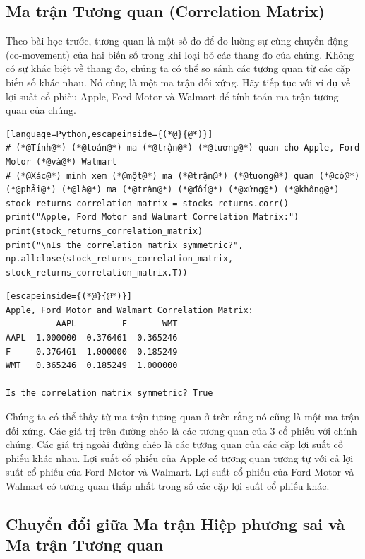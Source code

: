 \subsection{Ma trận Tương quan (Correlation Matrix)}

Theo bài học trước, tương quan là một số đo để đo lường sự cùng chuyển động (co-movement) của hai biến số trong khi loại bỏ các thang đo của chúng. Không có sự khác biệt về thang đo, chúng ta có thể so sánh các tương quan từ các cặp biến số khác nhau. Nó cũng là một ma trận đối xứng. Hãy tiếp tục với ví dụ về lợi suất cổ phiếu Apple, Ford Motor và Walmart để tính toán ma trận tương quan của chúng.

\begin{lstlisting}[language=Python,escapeinside={(*@}{@*)}]
# (*@Tính@*) (*@toán@*) ma (*@trận@*) (*@tương@*) quan cho Apple, Ford Motor (*@và@*) Walmart
# (*@Xác@*) minh xem (*@một@*) ma (*@trận@*) (*@tương@*) quan (*@có@*) (*@phải@*) (*@là@*) ma (*@trận@*) (*@đối@*) (*@xứng@*) (*@không@*)
stock_returns_correlation_matrix = stocks_returns.corr()
print("Apple, Ford Motor and Walmart Correlation Matrix:")
print(stock_returns_correlation_matrix)
print("\nIs the correlation matrix symmetric?", np.allclose(stock_returns_correlation_matrix, stock_returns_correlation_matrix.T))
\end{lstlisting}

\begin{lstlisting}[escapeinside={(*@}{@*)}]
Apple, Ford Motor and Walmart Correlation Matrix:
          AAPL         F       WMT
AAPL  1.000000  0.376461  0.365246
F     0.376461  1.000000  0.185249
WMT   0.365246  0.185249  1.000000

Is the correlation matrix symmetric? True
\end{lstlisting}

Chúng ta có thể thấy từ ma trận tương quan ở trên rằng nó cũng là một ma trận đối xứng. Các giá trị trên đường chéo là các tương quan của 3 cổ phiếu với chính chúng. Các giá trị ngoài đường chéo là các tương quan của các cặp lợi suất cổ phiếu khác nhau. Lợi suất cổ phiếu của Apple có tương quan tương tự với cả lợi suất cổ phiếu của Ford Motor và Walmart. Lợi suất cổ phiếu của Ford Motor và Walmart có tương quan thấp nhất trong số các cặp lợi suất cổ phiếu khác.

\subsection{Chuyển đổi giữa Ma trận Hiệp phương sai và Ma trận Tương quan}

